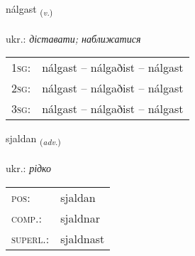 \documentclass[frontgrid, backgrid]{flacards}\usepackage[]{graphicx}\usepackage[]{xcolor}
\begin{document}
\renewcommand{\flhead}{\vskip5pt \fboxsep=0pt {\small\bfseries\footnotesize Sagnorð | дієслово}}
\renewcommand{\fcfoot}{\vskip5pt \fboxsep=0pt \hspace{2pt}{\small\bfseries\footnotesize 2K}}

\renewcommand{\blhead}{\vskip5pt {\small\bfseries\footnotesize Sagnorð | дієслово }}
\renewcommand{\bcfoot}{\vskip5pt \hspace{2pt}{\small\bfseries\footnotesize 2K}}


{nálgast \small{\textsubscript{(\textit{v.})}} \\[1ex] %
\textphonetic{[naulkast]} \\
ukr.: \emph{діставати; наближатися} \\  [2ex]
\renewcommand*{\arraystretch}{0.8}
\begin{tabular}{p{1cm}l}
\textsc{1sg}: & nálgast -- nálgaðist -- nálgast \\ 
\textsc{2sg}: & nálgast -- nálgaðist -- nálgast \\ 
\textsc{3sg}: & nálgast -- nálgaðist -- nálgast \\ 
\end{tabular}
}

\renewcommand{\flhead}{\vskip5pt \fboxsep=0pt {\small\bfseries\footnotesize Atviksorð | прислівник}}
\renewcommand{\fcfoot}{\vskip5pt \fboxsep=0pt \hspace{2pt}{\small\bfseries\footnotesize 2K}}

\renewcommand{\blhead}{\vskip5pt {\small\bfseries\footnotesize Atviksorð | прислівник }}
\renewcommand{\bcfoot}{\vskip5pt \hspace{2pt}{\small\bfseries\footnotesize 2K}}


{sjaldan \small{\textsubscript{(\textit{adv.})}} \\[1ex] %
\textphonetic{[sjaltan]} \\
ukr.: \emph{рідко} \\  [2ex]
\renewcommand*{\arraystretch}{0.8}
\begin{tabular}{ll}
\textsc{pos}: & sjaldan \\ 
\textsc{comp.}: & sjaldnar \\ 
\textsc{superl.}: & sjaldnast \\
\end{tabular}
}
\end{document}
